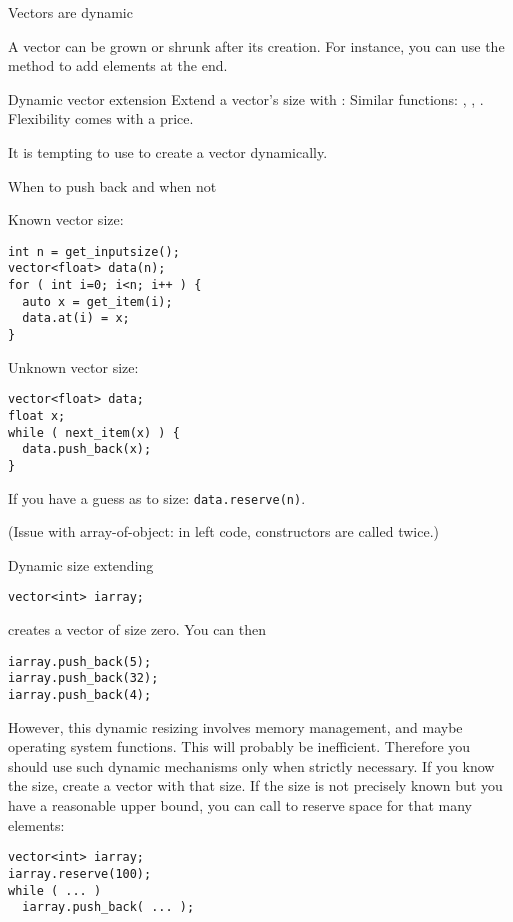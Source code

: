  {Vectors are dynamic}
\label{sec:stdvector-dynamic}

A vector
can be grown or shrunk after its creation.
For instance, you can use the  method to add elements at the end.

\begin{block}{Dynamic vector extension}
  \label{sl:vector-dynamic}
  Extend a vector's size with :
  Similar functions: , , .
  \slidenewline
  Flexibility comes with a price.
\end{block}

It is tempting to use  to create a vector dynamically.

\begin{block}{When to push back and when not}
  \label{sl:vecpushnot}
  \begin{multicols}{2}
    Known vector size:
\begin{lstlisting}
int n = get_inputsize();
vector<float> data(n);
for ( int i=0; i<n; i++ ) {
  auto x = get_item(i);
  data.at(i) = x;
}
\end{lstlisting}
\columnbreak
    Unknown vector size:
\begin{lstlisting}
vector<float> data;
float x;
while ( next_item(x) ) {
  data.push_back(x);
}
\end{lstlisting}
  \end{multicols}
  If you have a guess as to size: \lstinline+data.reserve(n)+.

  (Issue with array-of-object: in left code, constructors are called twice.)
\end{block}

\begin{block}{Dynamic size extending}
  \label{sl:vector-extend}
\begin{lstlisting}
vector<int> iarray;
\end{lstlisting}
creates a vector of size zero. You can then
\begin{lstlisting}
iarray.push_back(5);
iarray.push_back(32);
iarray.push_back(4);
\end{lstlisting}
\end{block}

However, this dynamic resizing involves memory management, and maybe
operating system functions. This will probably be
inefficient. Therefore you should use such dynamic mechanisms only
when strictly necessary.
If you know the size,
create a vector with that size. If the size is not precisely known but
you have a reasonable upper bound, you can call  to
reserve space for that many elements:
\begin{lstlisting}
vector<int> iarray;
iarray.reserve(100);
while ( ... )
  iarray.push_back( ... );
\end{lstlisting}

